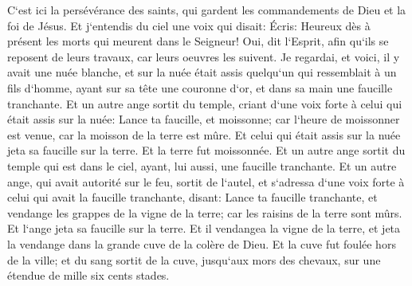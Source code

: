 \verse C`est ici la persévérance des saints, qui gardent les commandements de Dieu et la foi de Jésus. 
\verse Et j`entendis du ciel une voix qui disait: Écris: Heureux dès à présent les morts qui meurent dans le Seigneur! Oui, dit l`Esprit, afin qu`ils se reposent de leurs travaux, car leurs oeuvres les suivent. 
\verse Je regardai, et voici, il y avait une nuée blanche, et sur la nuée était assis quelqu`un qui ressemblait à un fils d`homme, ayant sur sa tête une couronne d`or, et dans sa main une faucille tranchante. 
\verse Et un autre ange sortit du temple, criant d`une voix forte à celui qui était assis sur la nuée: Lance ta faucille, et moissonne; car l`heure de moissonner est venue, car la moisson de la terre est mûre. 
\verse Et celui qui était assis sur la nuée jeta sa faucille sur la terre. Et la terre fut moissonnée. 
\verse Et un autre ange sortit du temple qui est dans le ciel, ayant, lui aussi, une faucille tranchante. 
\verse Et un autre ange, qui avait autorité sur le feu, sortit de l`autel, et s`adressa d`une voix forte à celui qui avait la faucille tranchante, disant: Lance ta faucille tranchante, et vendange les grappes de la vigne de la terre; car les raisins de la terre sont mûrs. 
\verse Et l`ange jeta sa faucille sur la terre. Et il vendangea la vigne de la terre, et jeta la vendange dans la grande cuve de la colère de Dieu. 
\verse Et la cuve fut foulée hors de la ville; et du sang sortit de la cuve, jusqu`aux mors des chevaux, sur une étendue de mille six cents stades. 

